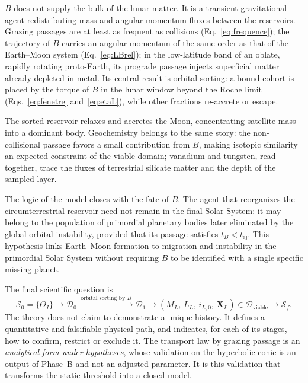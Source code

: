 \documentclass[11pt,a4paper,openany]{report}
\begin{document}
$B$ does not supply the bulk of the lunar matter. It is a transient gravitational
agent redistributing mass and angular-momentum fluxes between the reservoirs. Grazing passages are
at least as frequent as collisions (Eq.~\eqref{eq:frequence}); the trajectory of $B$ carries an
angular momentum of the same order as that of the Earth--Moon system (Eq.~\eqref{eq:LBrel}); in the
low-latitude band of an oblate, rapidly rotating proto-Earth, its prograde passage injects
superficial matter already depleted in metal. Its central result is orbital sorting: a bound cohort
is placed by the torque of $B$ in the lunar window beyond the Roche limit (Eqs.~\eqref{eq:fenetre}
and~\eqref{eq:etaL}), while other fractions re-accrete or escape.

The sorted reservoir relaxes and accretes the Moon, concentrating satellite mass into a dominant
body. Geochemistry belongs to the same story: the non-collisional passage favors a small
contribution from $B$, making isotopic similarity an expected constraint of the viable domain;
vanadium and tungsten, read together, trace the fluxes of terrestrial silicate matter and the depth
of the sampled layer.

The logic of the model closes with the fate of $B$. The agent that reorganizes the circumterrestrial
reservoir need not remain in the final Solar System: it may belong to the population of primordial
planetary bodies later eliminated by the global orbital instability, provided that its passage
satisfies $t_B<t_{\mathrm{ej}}$. This hypothesis links Earth--Moon formation to migration and
instability in the primordial Solar System without requiring $B$ to be identified with a single
specific missing planet.

The final scientific question is
\begin{equation}
\boxed{\;\mathcal{S}_0=\{\Theta_I\}\longrightarrow\mathcal{D}_0
\xrightarrow{\;\text{orbital sorting by }B\;}\mathcal{D}_1\longrightarrow
\left(M_L,\,L_L,\,i_{L,0},\,\mathbf{X}_L\right)\in\mathcal{D}_{\mathrm{viable}}
\longrightarrow\mathcal{S}_f.\;}
\label{eq:question}
\end{equation}
The theory does not claim to demonstrate a unique history. It defines a quantitative and
falsifiable physical path, and indicates, for each of its stages, how to confirm, restrict or
exclude it. The transport law by grazing passage is an \emph{analytical form under hypotheses},
whose validation on the hyperbolic conic is an output of Phase~B and not an adjusted parameter. It
is this validation that transforms the static threshold into a closed model.
\end{document}
